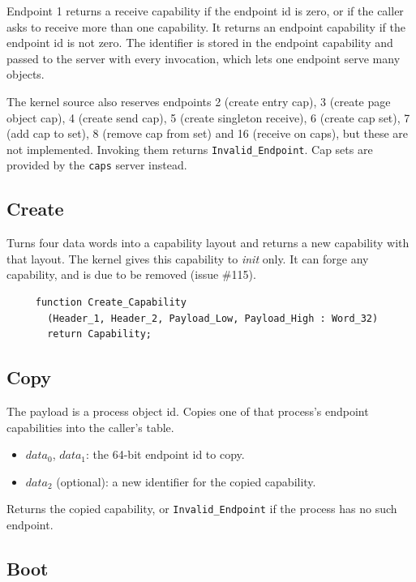 Endpoint 1 returns a receive capability if the endpoint id is zero, or if the caller asks to receive more than one capability.  It returns an endpoint capability if the endpoint id is not zero.  The identifier is stored in the endpoint capability and passed to the server with every invocation, which lets one endpoint serve many objects.

The kernel source also reserves endpoints 2 (create entry cap), 3 (create page object cap), 4 (create send cap), 5 (create singleton receive), 6 (create cap set), 7 (add cap to set), 8 (remove cap from set) and 16 (receive on caps), but these are not implemented.  Invoking them returns {\tt Invalid\_Endpoint}.  Cap sets are provided by the {\tt caps} server instead.

\subsection{Create}

Turns four data words into a capability layout and returns a new capability with that layout.  The kernel gives this capability to {\em init} only.  It can forge any capability, and is due to be removed (issue \#115).

\begin{verbatim}
     function Create_Capability
       (Header_1, Header_2, Payload_Low, Payload_High : Word_32)
       return Capability;
\end{verbatim}

\subsection{Copy}

The payload is a process object id.  Copies one of that process's endpoint capabilities into the caller's table.

\begin{itemize}
    \item $data_0$, $data_1$: the 64-bit endpoint id to copy.
    \item $data_2$ (optional): a new identifier for the copied capability.
\end{itemize}

Returns the copied capability, or {\tt Invalid\_Endpoint} if the process has no such endpoint.

\subsection{Boot}

